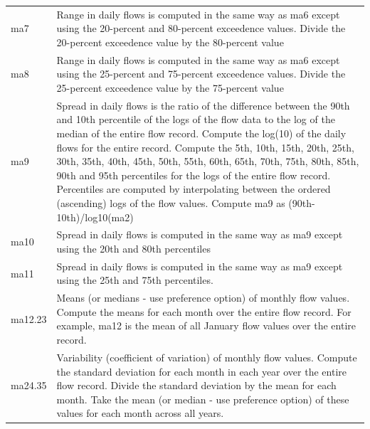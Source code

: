 \documentclass[a4paper,11pt]{article}\usepackage[]{graphicx}\usepackage[]{color}
\begin{document}
\begin{table}
\begin{threeparttable}[b]
\begin{tabularx}{\textwidth}{|l|X|}
  ma7 & Range in daily flows is computed in the same way as ma6 except using the 20-percent and 80-percent exceedence values. Divide the 20-percent exceedence value by the 80-percent value \\
  ma8 & Range in daily flows is computed in the same way as ma6 except using the 25-percent and 75-percent exceedence values. Divide the 25-percent exceedence value by the 75-percent value \\
  ma9 & Spread in daily flows is the ratio of the difference between the 90th and 10th percentile of the logs of the flow data to the log of the median of the entire flow record. Compute the log(10) of the daily flows for the entire record. Compute the 5th, 10th, 15th, 20th, 25th, 30th, 35th, 40th, 45th, 50th, 55th, 60th, 65th, 70th, 75th, 80th, 85th, 90th and 95th percentiles for the logs of the entire flow record. Percentiles are computed by interpolating between the ordered (ascending) logs of the flow values. Compute ma9 as (90th-10th)/log10(ma2) \\
  ma10 & Spread in daily flows is computed in the same way as ma9 except using the 20th and 80th percentiles \\
  ma11 & Spread in daily flows is computed in the same way as ma9 except using the 25th and 75th percentiles. \\
  ma12.23 & Means (or medians - use preference option) of monthly flow values. Compute the means for each month over the entire flow record. For example, ma12 is the mean of all January flow values over the entire record. \\
  ma24.35 & Variability (coefficient of variation) of monthly flow values. Compute the standard deviation for each month in each year over the entire flow record. Divide the standard deviation by the mean for each month. Take the mean (or median - use preference option) of these values for each month across all years. \\
  \hline
  \end{tabularx}
  \end{threeparttable}
\end{table}
\end{document}

